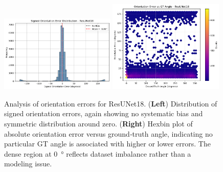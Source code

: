 \begin{figure}[H]
    \centering
    \includegraphics[width=0.49\textwidth]{figures/appendix/ResUNet18 Signed Orientation Error Distribution.png}
    \hfill
    \includegraphics[width=0.49\textwidth]{figures/appendix/ResUNet18 Orientation Error vs GT-Angle.png}
    \caption{
        Analysis of orientation errors for ResUNet18.
        (\textbf{Left}) Distribution of signed orientation errors, again showing no systematic bias and symmetric distribution around zero.
        (\textbf{Right}) Hexbin plot of absolute orientation error versus ground‑truth angle, indicating no particular GT angle is associated with higher or lower errors.
        The dense region at \qty{0}{\degree} reflects dataset imbalance rather than a modeling issue.
    }
    \label{fig:appendix_resunet18_orientation}
\end{figure}

